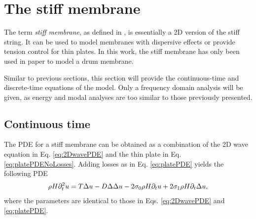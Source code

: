 {%



\section{The stiff membrane}
The term \textit{stiff membrane}, as defined in \cite{Fletcher1998}, is essentially a 2D version of the stiff string. It can be used to model membranes with dispersive effects or provide tension control for thin plates. In this work, the stiff membrane has only been used in paper \citeP[F] to model a drum membrane. 

Similar to previous sections, this section will provide the continuous-time and discrete-time equations of the model. Only a frequency domain analysis will be given, as energy and modal analyses are too similar to those previously presented.

\subsection{Continuous time}
The PDE for a stiff membrane can be obtained as a combination of the 2D wave equation in Eq. \eqref{eq:2DwavePDE} and the thin plate in Eq. \eqref{eq:platePDENoLosses}. Adding losses as in Eq. \eqref{eq:platePDE} yields the following PDE
\begin{equation}\label{eq:stiffMembranePDE}
    \rho H \partial_t^2 u = T\Delta u - D
    \Delta\Delta u- 2\sigma_{0} \rho H \partial_t u + 2 \sigma_{1}\rho H  \partial_t \Delta u,
\end{equation}
where the parameters are identical to those in Eqs. \eqref{eq:2DwavePDE} and \eqref{eq:platePDE}.

}
